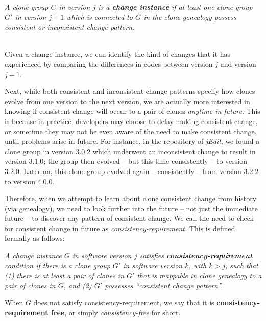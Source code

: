 \begin{definition} 
\label{}
{\em 
A clone group $G$ in version $j$ is a {\bf change instance} if at least one clone group $G'$ in version $j+1$ which is connected to $G$ in the clone genealogy possess consistent or inconsistent change pattern. 
}
\end{definition}

~\\
Given a change instance, we can identify the kind of changes that it has experienced by comparing the differences in codes between version $j$ and version $j+1$. 

Next, while both consistent and inconsistent change patterns specify how clones evolve from one version to the next version, we are actually more interested in knowing if consistent change will occur to a pair of clones {\em anytime in future\/}. 
This is because in practice, developers may choose to delay making consistent change, or sometime they may not be even aware of the need to make consistent change, until problems arise in future.
For instance, in the repository of {\em jEdit}, we found a clone group in version $3.0.2$ which underwent an inconsistent change to result in version $3.1.0$; the group then evolved -- but this time consistently -- to version $3.2.0$. 
Later on, this clone group evolved again -- consistently -- from version $3.2.2$ to version $4.0.0$. 

Therefore, when we attempt to learn about clone consistent change from history (via genealogy), we need to look further into the future -- not just the immediate future -- to discover any pattern of consistent change. 
We call the need to check for consistent change in future as {\em consistency-requirement.}
This is defined formally as follows: \\

\begin{definition} 
  \label{}
  {\em 
A change instance $G$ in software version $j$ satisfies 
{\bf  consistency-requirement\/} condition if there is a clone group $G'$ in software version $k$, with $k>j$, such that (1) there is at least a pair of clones in $G'$ that is mappable in clone genealogy to a pair of clones in $G$, and (2) $G'$ possesses ``consistent change pattern''. 

When $G$ does not satisfy consistency-requirement, we say that it is {\bf  consistency-requirement free\/}, or simply {\em consistency-free\/} for short. }
\end{definition}

